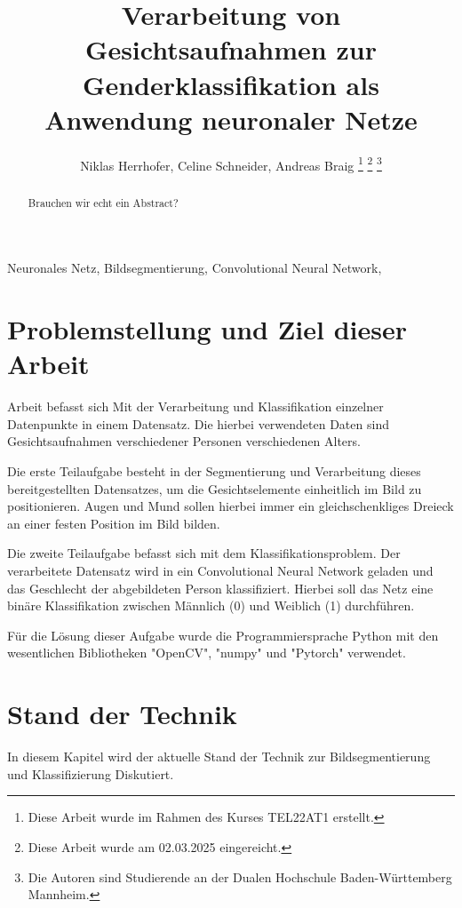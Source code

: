 \documentclass[journal,twoside,web]{ieeecolor}
\begin{document}
\title{Verarbeitung von Gesichtsaufnahmen zur Genderklassifikation als Anwendung neuronaler Netze}
\author{Niklas Herrhofer, Celine Schneider, Andreas Braig
\thanks{Diese Arbeit wurde im Rahmen des Kurses TEL22AT1 erstellt.}
\thanks{Diese Arbeit wurde am 02.03.2025 eingereicht.}  
\thanks{Die Autoren sind Studierende an der Dualen Hochschule Baden-Württemberg Mannheim.}}

\maketitle

\begin{abstract}
    Brauchen wir echt ein Abstract? 
\end{abstract}


\begin{IEEEkeywords}
    Neuronales Netz, Bildsegmentierung, Convolutional Neural Network, 
\end{IEEEkeywords}

\section{Problemstellung und Ziel dieser Arbeit}
\label{sec:introduction}
 Arbeit befasst sich Mit der Verarbeitung und Klassifikation einzelner Datenpunkte in einem Datensatz.
Die hierbei verwendeten Daten sind Gesichtsaufnahmen verschiedener Personen verschiedenen Alters. 

Die erste Teilaufgabe besteht in der Segmentierung und Verarbeitung dieses bereitgestellten Datensatzes, um die Gesichtselemente einheitlich im Bild zu positionieren. 
Augen und Mund sollen hierbei immer ein gleichschenkliges Dreieck an einer festen Position im Bild bilden. 

Die zweite Teilaufgabe befasst sich mit dem Klassifikationsproblem. 
Der verarbeitete Datensatz wird in ein Convolutional Neural Network geladen und das Geschlecht der abgebildeten Person klassifiziert. 
Hierbei soll das Netz eine binäre Klassifikation zwischen Männlich (0) und Weiblich (1) durchführen.

Für die Lösung dieser Aufgabe wurde die Programmiersprache Python mit den wesentlichen Bibliotheken "OpenCV", "numpy" und "Pytorch" verwendet. 

\section{Stand der Technik}
In diesem Kapitel wird der aktuelle Stand der Technik zur Bildsegmentierung und Klassifizierung Diskutiert.
\end{document}
